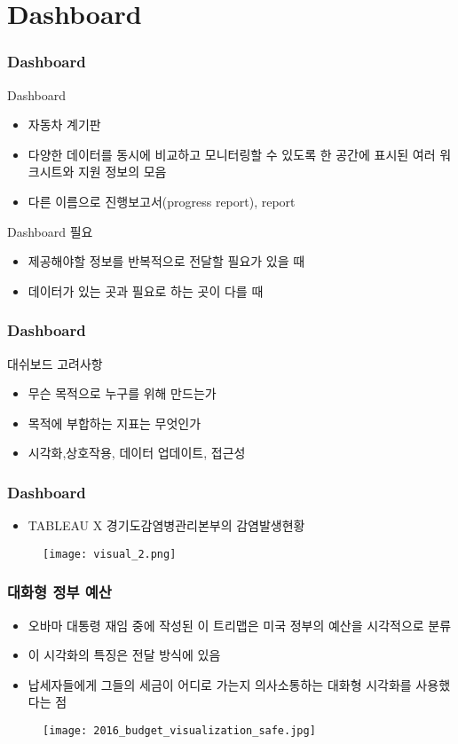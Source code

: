 \documentclass[10pt]{beamer}
\begin{document}
\section{Dashboard}
\begin{frame}
\frametitle{Dashboard}
	\begin{block}{Dashboard}
	\begin{itemize}
	\item 자동차 계기판
	\item 다양한 데이터를 동시에 비교하고 모니터링할 수 있도록 한 공간에 표시된 여러 워크시트와 지원 정보의 모음
	\item 다른 이름으로 진행보고서(progress report), report
	\end{itemize}
	\end{block}
	
	\begin{block}{Dashboard 필요}
	\begin{itemize}
	\item 제공해야할 정보를 반복적으로 전달할 필요가 있을 때
	\item 데이터가 있는 곳과 필요로 하는 곳이 다를 때
	\end{itemize}
	\end{block}
\end{frame}

\begin{frame}
\frametitle{Dashboard}
	\begin{block}{대쉬보드 고려사항}
	\begin{itemize}
	\item 무슨 목적으로 누구를 위해 만드는가
	\item 목적에 부합하는 지표는 무엇인가
	\item 시각화,상호작용, 데이터 업데이트, 접근성
	\end{itemize}
	\end{block}
\end{frame}

\begin{frame}
\frametitle{Dashboard}
		\begin{itemize}
			\item TABLEAU X 경기도감염병관리본부의 감염발생현황
		\end{itemize}
		\begin{figure}
			\texttt{[image: visual\_2.png]}
		\end{figure}
\end{frame}

\begin{frame}
\frametitle{대화형 정부 예산}
\begin{itemize}
	\item 오바마 대통령 재임 중에 작성된 이 트리맵은 미국 정부의 예산을 시각적으로 분류
	\item 이 시각화의 특징은 전달 방식에 있음
	\item 납세자들에게 그들의 세금이 어디로 가는지 의사소통하는 대화형 시각화를 사용했다는 점
\end{itemize}
	\begin{figure}
		\texttt{[image: 2016\_budget\_visualization\_safe.jpg]}
	\end{figure}
\end{frame}
\end{document}
